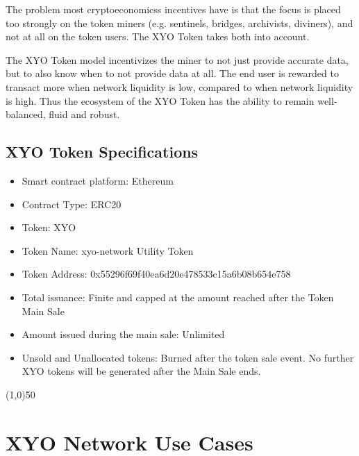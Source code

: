 \documentclass{article}
\begin{document}
The problem most \glspl{cryptoeconomics} incentives have is that the focus is placed too strongly on the token miners (e.g. \Glspl{sentinel}, \Glspl{bridge}, \Glspl{archivist}, \Glspl{diviner}), and not at all on the token users. The XYO Token takes both into account.

The XYO Token model incentivizes the miner to not just provide accurate data, but to also know when to not provide data at all. The end user is rewarded to transact more when network liquidity is low, compared to when network liquidity is high. Thus the ecosystem of the XYO Token has the ability to remain well-balanced, fluid and robust.

\subsection {XYO Token Specifications}
\begin{itemize}
\item Smart contract platform: Ethereum
\item Contract Type: ERC20
\item Token: XYO
\item Token Name: \Gls{xyo-network} Utility Token
\item Token Address: 0x55296f69f40ea6d20e478533c15a6b08b654e758
\item Total issuance: Finite and capped at the amount reached after the Token Main Sale
\item Amount issued during the main sale: Unlimited
\item Unsold and Unallocated tokens: Burned after the token sale event. No further XYO tokens will be generated after the Main Sale ends.
\end{itemize}

\begin{center}
\line(1,0){50}
\end{center}

\section{XYO Network Use Cases}
\end{document}

